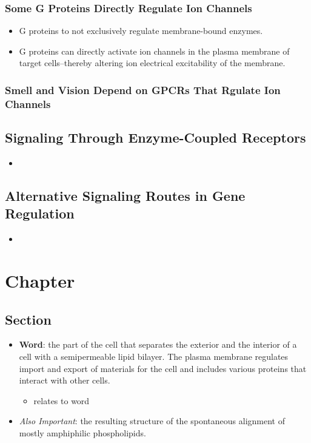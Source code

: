 \documentclass[12pt,a4paper]{article}
\begin{document}
\subsubsection{Some G Proteins Directly Regulate Ion Channels}
\begin{itemize}
    \item G proteins to not exclusively regulate membrane-bound enzymes. 
    \item G proteins can directly activate ion channels in the plasma membrane of target cells--thereby altering ion electrical excitability of the membrane.
\end{itemize}

\subsubsection{Smell and Vision Depend on GPCRs That Rgulate Ion Channels}

\subsection{Signaling Through Enzyme-Coupled Receptors}
\begin{itemize}
    \item 
\end{itemize}

\subsection{Alternative Signaling Routes in Gene Regulation}
\begin{itemize}
    \item 
\end{itemize}

\clearpage
\section{Chapter}
\subsection{Section}
\begin{itemize}
    \item \textbf{Word}: the part of the cell that separates the exterior and the interior of a cell with a semipermeable lipid bilayer. The plasma membrane regulates import and export of materials for the cell and includes various proteins that interact with other cells. 
    \begin{itemize}
        \item relates to word
    \end{itemize}
    \item \textit{Also Important}: the resulting structure of the spontaneous alignment of mostly amphiphilic phospholipids. 
\end{itemize}
\end{document}
